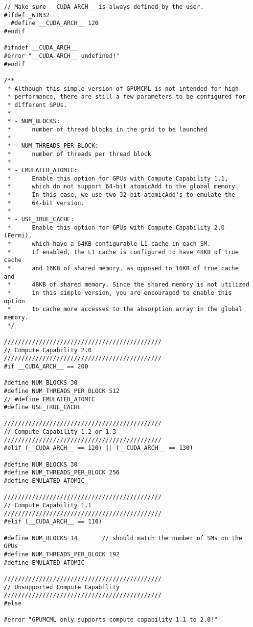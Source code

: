 \begin{lstlisting}
// Make sure __CUDA_ARCH__ is always defined by the user.
#ifdef _WIN32 
  #define __CUDA_ARCH__ 120
#endif

#ifndef __CUDA_ARCH__
#error "__CUDA_ARCH__ undefined!"
#endif

/**
 * Although this simple version of GPUMCML is not intended for high
 * performance, there are still a few parameters to be configured for
 * different GPUs.
 *
 * - NUM_BLOCKS:
 *      number of thread blocks in the grid to be launched
 *
 * - NUM_THREADS_PER_BLOCK:
 *      number of threads per thread block
 *
 * - EMULATED_ATOMIC:
 *      Enable this option for GPUs with Compute Capability 1.1,
 *      which do not support 64-bit atomicAdd to the global memory.
 *      In this case, we use two 32-bit atomicAdd's to emulate the
 *      64-bit version.
 *
 * - USE_TRUE_CACHE:
 *      Enable this option for GPUs with Compute Capability 2.0 (Fermi),
 *      which have a 64KB configurable L1 cache in each SM.
 *      If enabled, the L1 cache is configured to have 48KB of true cache
 *      and 16KB of shared memory, as opposed to 16KB of true cache and
 *      48KB of shared memory. Since the shared memory is not utilized
 *      in this simple version, you are encouraged to enable this option
 *      to cache more accesses to the absorption array in the global memory.
 */

/////////////////////////////////////////////
// Compute Capability 2.0
/////////////////////////////////////////////
#if __CUDA_ARCH__ == 200

#define NUM_BLOCKS 30
#define NUM_THREADS_PER_BLOCK 512
// #define EMULATED_ATOMIC
#define USE_TRUE_CACHE

/////////////////////////////////////////////
// Compute Capability 1.2 or 1.3
/////////////////////////////////////////////
#elif (__CUDA_ARCH__ == 120) || (__CUDA_ARCH__ == 130)

#define NUM_BLOCKS 30
#define NUM_THREADS_PER_BLOCK 256
#define EMULATED_ATOMIC

/////////////////////////////////////////////
// Compute Capability 1.1
/////////////////////////////////////////////
#elif (__CUDA_ARCH__ == 110)

#define NUM_BLOCKS 14       // should match the number of SMs on the GPUs
#define NUM_THREADS_PER_BLOCK 192
#define EMULATED_ATOMIC

/////////////////////////////////////////////
// Unsupported Compute Capability
/////////////////////////////////////////////
#else

#error "GPUMCML only supports compute capability 1.1 to 2.0!"


\end{lstlisting}

